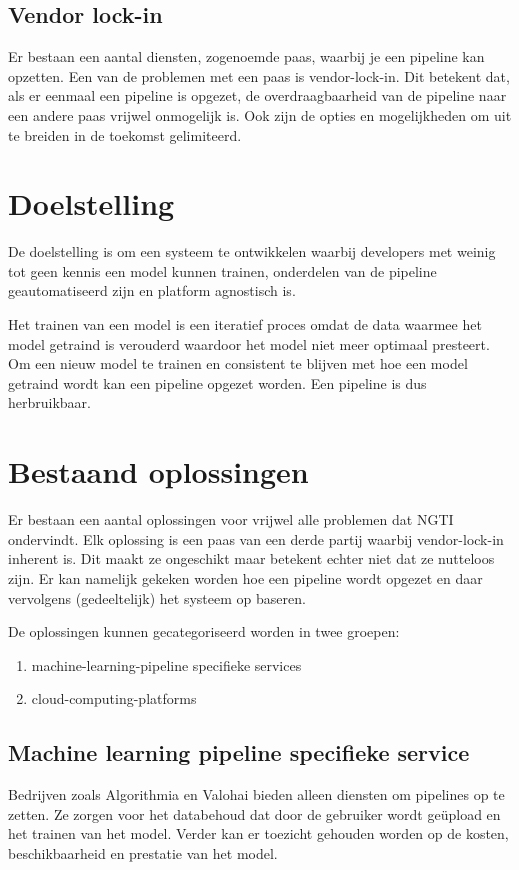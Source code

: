 \subsection{Vendor lock-in}\label{sec:vendor-lock-in}
Er bestaan een aantal diensten, zogenoemde \acrfull{paas}, waarbij je een pipeline kan opzetten. Een van de problemen met een \acrshort{paas} is \gls{vendor-lock-in}. Dit betekent dat, als er eenmaal een pipeline is opgezet, de overdraagbaarheid van de pipeline naar een andere \acrshort{paas} vrijwel onmogelijk is. Ook zijn de opties en mogelijkheden om uit te breiden in de toekomst gelimiteerd.

\section{Doelstelling}\label{sec:doelstelling}
De doelstelling is om een systeem te ontwikkelen waarbij developers met weinig tot geen kennis een model kunnen trainen, onderdelen van de pipeline geautomatiseerd zijn en platform agnostisch is.

Het trainen van een model is een iteratief proces omdat de data waarmee het model getraind is verouderd waardoor het model niet meer optimaal presteert. Om een nieuw model te trainen en consistent te blijven met hoe een model getraind wordt kan een pipeline opgezet worden. Een pipeline is dus herbruikbaar.

\section{Bestaand oplossingen}\label{sec:bestaande-oplossingen}
Er bestaan een aantal oplossingen voor vrijwel alle problemen dat NGTI ondervindt. Elk oplossing is een \acrshort{paas} van een derde partij waarbij \gls{vendor-lock-in} inherent is. Dit maakt ze ongeschikt maar betekent echter niet dat ze nutteloos zijn. Er kan namelijk gekeken worden hoe een pipeline wordt opgezet en daar vervolgens (gedeeltelijk) het systeem op baseren.

De oplossingen kunnen gecategoriseerd worden in twee groepen:
\begin{enumerate}
  \item \Gls{machine-learning-pipeline} specifieke services
  \item \Glspl{cloud-computing-platform}
\end{enumerate}

\subsection{Machine learning pipeline specifieke service}\label{subsec:machine-learning-pipeline-specifieke-service}
Bedrijven zoals Algorithmia \cite{algorithmia-website} en Valohai \cite{valohai-website} bieden alleen diensten om pipelines op te zetten. Ze zorgen voor het databehoud dat door de gebruiker wordt geüpload en het trainen van het model. Verder kan er toezicht gehouden worden op de kosten, beschikbaarheid en prestatie van het model.

